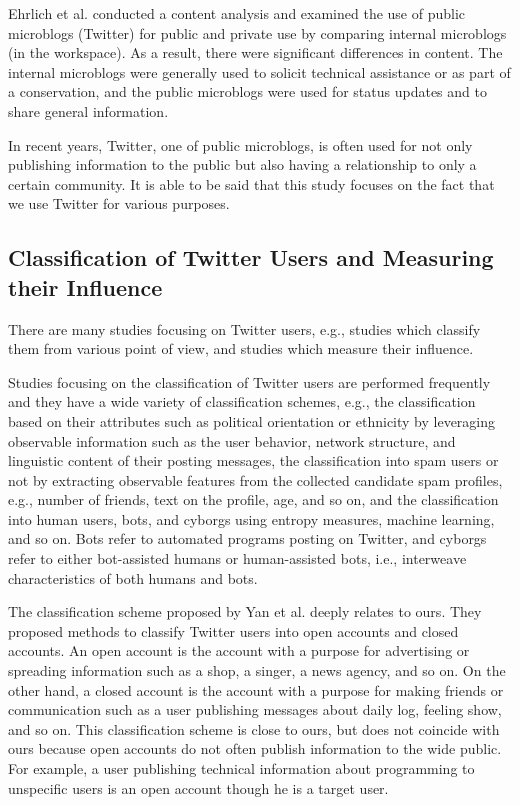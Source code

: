 Ehrlich et al.\cite{ehrlich2010microblogging} conducted a
content analysis and examined the use of public microblogs
(Twitter) for public and private use by comparing internal
microblogs (in the workspace).  As a result, there were
significant differences in content.  The internal microblogs
were generally used to solicit technical assistance or as part of a
conservation, and the public microblogs were used for status
updates and to share general information.

In recent years, Twitter, one of public microblogs, is often
used for not only publishing information to the public but also having a
relationship to only a certain community.  It is able to be said that
this study focuses on the fact that we use Twitter for various purposes.

\subsection{Classification of Twitter Users and Measuring their Influence}
\label{subsec:Twitter User}

There are many studies focusing on Twitter users, e.g., studies which
classify them from various point of view, and studies which measure
their influence.

Studies focusing on the classification of Twitter users are performed
frequently and they have a wide variety of classification schemes, e.g.,
the classification based on their attributes such as political
orientation or ethnicity by leveraging observable information such as
the user behavior, network structure, and linguistic content of their
posting messages\cite{pennacchiotti2011machine}, the classification
into spam users or not by extracting observable features from the
collected candidate spam profiles, e.g., number of friends, text on the
profile, age, and so on\cite{lee2010social}, and the classification
into human users, bots, and cyborgs using entropy measures, machine
learning, and so on\cite{chu2010tweeting}.  Bots refer to automated
programs posting on Twitter, and cyborgs refer to either bot-assisted
humans or human-assisted bots, i.e., interweave characteristics of both
humans and bots.

The classification scheme proposed by Yan et
al.\cite{yan2013classifying} deeply relates to ours.  They proposed
methods to classify Twitter users into open accounts and closed
accounts.  An open account is the
account with a purpose for advertising or spreading information such as
a shop, a singer, a news agency, and so on.  On the other hand, a closed
account is the
account with a purpose for making friends or communication such as a
user publishing messages about daily log, feeling show, and so on.
This classification scheme is close to ours, but does not coincide with
ours because open accounts do not often publish information to the wide
public.  For example, a user publishing technical information
about programming to unspecific users is an open account though he is a
target user.

